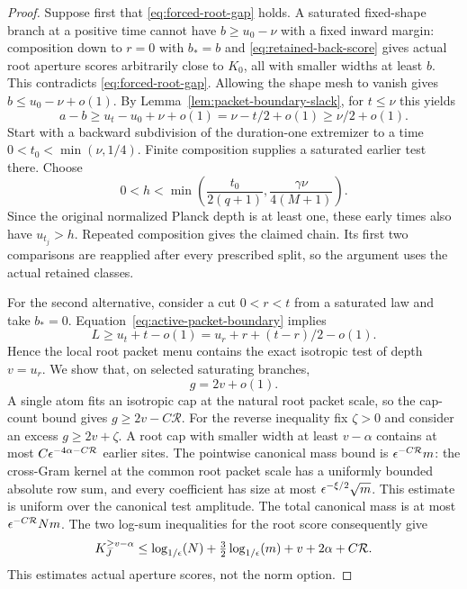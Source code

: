 \begin{proof}
Suppose first that \eqref{eq:forced-root-gap} holds.  A saturated
fixed-shape branch at a positive time cannot have
$b\ge u_0-\nu$ with a fixed inward margin: composition down to
$r=0$ with $b_*=b$ and
\eqref{eq:retained-back-score} gives actual root aperture scores
arbitrarily close to $K_0$, all with smaller widths at least $b$.
This contradicts \eqref{eq:forced-root-gap}.  Allowing the shape mesh
to vanish gives $b\le u_0-\nu+o(1)$.
By Lemma~\ref{lem:packet-boundary-slack}, for $t\le\nu$ this yields
\[
 a-b\ge u_t-u_0+\nu+o(1)
          =\nu-t/2+o(1)\ge\nu/2+o(1).
\]
Start with a backward subdivision of the duration-one extremizer to
a time $0<t_0<\min(\nu,1/4)$.  Finite composition supplies a
saturated earlier test there.  Choose
\[
 0<h<\min\left(\frac{t_0}{2(q+1)},
                    \frac{\gamma\nu}{4(M+1)}\right).
\]
Since the original normalized Planck depth is at least one, these
early times also have $u_{t_j}>h$.  Repeated composition gives the
claimed chain.  Its first two comparisons are reapplied after every
prescribed split, so the argument uses the actual retained classes.

For the second alternative, consider a cut $0<r<t$ from a saturated
law and take $b_*=0$.  Equation~\eqref{eq:active-packet-boundary}
implies
\[
 L\ge u_t+t-o(1)=u_r+r+(t-r)/2-o(1).
\]
Hence the local root packet menu contains the exact isotropic test
of depth $v=u_r$.  We show that, on selected saturating branches,
\begin{equation}\label{eq:isotropic-cap-maximum}
 g=2v+o(1).
\end{equation}
A single atom fits an isotropic cap at the natural root packet scale,
so the cap-count bound gives $g\ge2v-C\mathcal R$.
For the reverse inequality fix $\zeta>0$ and consider an excess
$g\ge2v+\zeta$.  A root cap with smaller width at least $v-\alpha$
contains at most $C\epsilon^{-4\alpha-C\mathcal R}$ earlier sites.
The pointwise canonical mass bound is $\epsilon^{-C\mathcal R}m$:
the cross-Gram kernel at the common root packet scale has a uniformly
bounded absolute row sum, and every coefficient has size at most
$\epsilon^{-\xi/2}\sqrt m$.  This estimate is uniform over the canonical
test amplitude.  The total canonical mass
is at most $\epsilon^{-C\mathcal R}Nm$.  The two log-sum inequalities
for the root score consequently give
\begin{equation}\label{eq:nearly-isotropic-root-bound}
 K_J^{\ge v-\alpha}
 \le\log_{1/\epsilon}\!\left(N\right)+\tfrac32\log_{1/\epsilon}\!\left(m\right)+v+2\alpha+C\mathcal R.
\end{equation}
This estimates actual aperture scores, not the norm option.


\end{proof}
